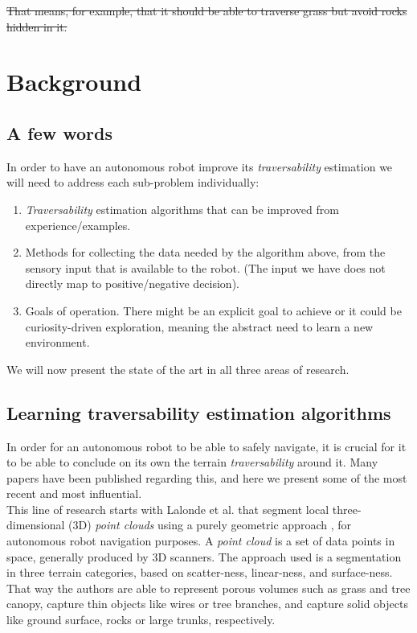 \documentclass[12pt,a4paper]{report}
\newcommand{\term}{\textit}
\newcommand{\acronym}{\MakeUppercase}
\begin{document}
	\sout{That means, for example, that it should be able to traverse grass but avoid 
	rocks hidden in it.}
	
	\chapter{Background}
	\label{sec:bg}
	
	\section{A few words}
	\label{sec:bg:intro}
	
	In order to have an autonomous robot improve its \term{traversability} 
	estimation we will need to address each sub-problem individually:
	
	\begin{enumerate}
		\item \term{Traversability} estimation algorithms that can be improved from 
		experience/examples.
		\item Methods for collecting the data needed by the algorithm above, from 
		the sensory input that is available to the robot. (The input we have does not 
		directly map to positive/negative decision).
		\item Goals of operation. There might be an explicit goal to achieve or it 
		could be curiosity-driven exploration, meaning the abstract need to learn a 
		new environment.
	\end{enumerate}
	
	We will now present the state of the art in all three areas of research.
	\\
	
	\section{Learning traversability estimation algorithms}
	\label{sec:bg:trav}
	
	In order for an autonomous robot to be able to safely navigate, it is crucial 
	for it to be able to conclude on its own the terrain \term{traversability} 
	around it. Many papers have been published regarding this, and here we present 
	some of the most recent and most influential.
	\\
	
	This line of research starts with Lalonde et al. that segment local three-
	dimensional (\acronym{3d}) \term{point clouds} using a purely geometric 
	approach \cite{Lalonde}, for autonomous robot navigation purposes. A 
	\term{point cloud} is a set of data points in space, generally produced by 
	\acronym{3d} scanners. The approach used is a segmentation in three terrain 
	categories, based on scatter-ness, linear-ness, and surface-ness. That way 
	the authors are able to represent porous volumes such as grass and tree canopy, 
	capture thin objects like wires or tree branches, and capture solid objects 
	like ground surface, rocks or large trunks, respectively.
	\\	
	
\end{document}
